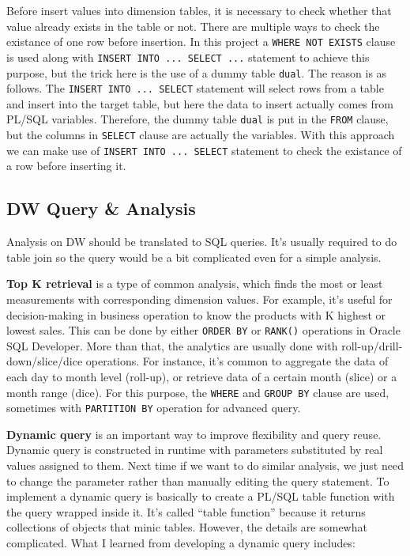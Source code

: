 \documentclass[
  a4paper,
]{article}
\begin{document}
Before insert values into dimension tables, it is necessary to check
whether that value already exists in the table or not. There are
multiple ways to check the existance of one row before insertion. In
this project a \texttt{WHERE\ NOT\ EXISTS} clause is used along with
\texttt{INSERT\ INTO\ ...\ SELECT\ ...} statement to achieve this
purpose, but the trick here is the use of a dummy table \texttt{dual}.
The reason is as follows. The \texttt{INSERT\ INTO\ ...\ SELECT}
statement will select rows from a table and insert into the target
table, but here the data to insert actually comes from PL/SQL variables.
Therefore, the dummy table \texttt{dual} is put in the \texttt{FROM}
clause, but the columns in \texttt{SELECT} clause are actually the
variables. With this approach we can make use of
\texttt{INSERT\ INTO\ ...\ SELECT} statement to check the existance of a
row before inserting it.

\hypertarget{dw-query-analysis}{%
\subsection{DW Query \& Analysis}\label{dw-query-analysis}}

Analysis on DW should be translated to SQL queries. It's usually
required to do table join so the query would be a bit complicated even
for a simple analysis.

\textbf{Top K retrieval} is a type of common analysis, which finds the
most or least measurements with corresponding dimension values. For
example, it's useful for decision-making in business operation to know
the products with K highest or lowest sales. This can be done by either
\texttt{ORDER\ BY} or \texttt{RANK()} operations in Oracle SQL
Developer. More than that, the analytics are usually done with
roll-up/drill-down/slice/dice operations. For instance, it's common to
aggregate the data of each day to month level (roll-up), or retrieve
data of a certain month (slice) or a month range (dice). For this
purpose, the \texttt{WHERE} and \texttt{GROUP\ BY} clause are used,
sometimes with \texttt{PARTITION\ BY} operation for advanced query.

\textbf{Dynamic query} is an important way to improve flexibility and
query reuse. Dynamic query is constructed in runtime with parameters
substituted by real values assigned to them. Next time if we want to do
similar analysis, we just need to change the parameter rather than
manually editing the query statement. To implement a dynamic query is
basically to create a PL/SQL table function with the query wrapped
inside it. It's called ``table function'' because it returns collections
of objects that minic tables. However, the details are somewhat
complicated. What I learned from developing a dynamic query includes:
\end{document}
